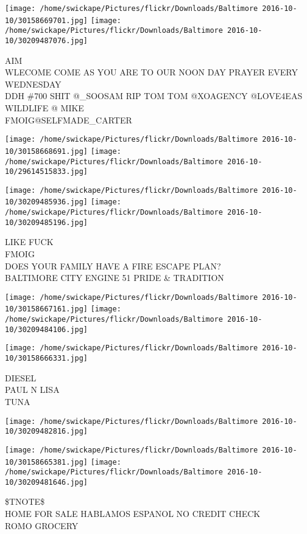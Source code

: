 \documentclass[10pt,letterpaper]{article}
\begin{document}
\texttt{[image: /home/swickape/Pictures/flickr/Downloads/Baltimore 2016-10-10/30158669701.jpg]}
\texttt{[image: /home/swickape/Pictures/flickr/Downloads/Baltimore 2016-10-10/30209487076.jpg]}

AIM\\
WLECOME COME AS YOU ARE TO OUR NOON DAY PRAYER EVERY WEDNESDAY\\
DDH \#700 SHIT @\_SOOSAM RIP TOM TOM @XOAGENCY @LOVE4EAS WILDLIFE @ MIKE\\
FMOIG@SELFMADE\_CARTER\\
\pagebreak

\texttt{[image: /home/swickape/Pictures/flickr/Downloads/Baltimore 2016-10-10/30158668691.jpg]}
\texttt{[image: /home/swickape/Pictures/flickr/Downloads/Baltimore 2016-10-10/29614515833.jpg]}

\texttt{[image: /home/swickape/Pictures/flickr/Downloads/Baltimore 2016-10-10/30209485936.jpg]}
\texttt{[image: /home/swickape/Pictures/flickr/Downloads/Baltimore 2016-10-10/30209485196.jpg]}

LIKE FUCK\\
FMOIG\\
DOES YOUR FAMILY HAVE A FIRE ESCAPE PLAN?\\
BALTIMORE CITY ENGINE 51 PRIDE \& TRADITION\\
\pagebreak

\texttt{[image: /home/swickape/Pictures/flickr/Downloads/Baltimore 2016-10-10/30158667161.jpg]}
\texttt{[image: /home/swickape/Pictures/flickr/Downloads/Baltimore 2016-10-10/30209484106.jpg]}

\texttt{[image: /home/swickape/Pictures/flickr/Downloads/Baltimore 2016-10-10/30158666331.jpg]}

DIESEL\\
PAUL N LISA\\
TUNA\\
\pagebreak

\texttt{[image: /home/swickape/Pictures/flickr/Downloads/Baltimore 2016-10-10/30209482816.jpg]}

\vspace{0.25in}
\texttt{[image: /home/swickape/Pictures/flickr/Downloads/Baltimore 2016-10-10/30158665381.jpg]}
\texttt{[image: /home/swickape/Pictures/flickr/Downloads/Baltimore 2016-10-10/30209481646.jpg]}

\$TNOTE\$\\
HOME FOR SALE HABLAMOS ESPANOL NO CREDIT CHECK\\
ROMO GROCERY\\
\pagebreak
\end{document}
